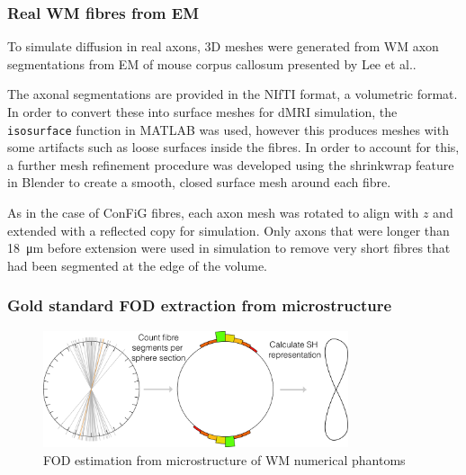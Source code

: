 \subsubsection{Real WM fibres from EM}
\label{sec:frf_real_axon_meshing}
To simulate diffusion in real axons, 3D meshes were generated from \ac{WM} axon segmentations from \acf{EM} of mouse corpus callosum presented by Lee et al.\cite{Lee2019b}.

The axonal segmentations are provided in the NIfTI format, a volumetric format. In order to convert these into surface meshes for \ac{dMRI} simulation, the \texttt{isosurface} function in MATLAB was used, however this produces meshes with some artifacts such as loose surfaces inside the fibres.
In order to account for this, a further mesh refinement procedure was developed using the shrinkwrap feature in Blender to create a smooth, closed surface mesh around each fibre.

As in the case of ConFiG fibres, each axon mesh was rotated to align with $z$ and extended with a reflected copy for simulation. Only axons that were longer than \SI{18}{\micro\metre} before extension were used in simulation to remove very short fibres that had been segmented at the edge of the volume. 

\subsubsection{Gold standard FOD extraction from microstructure}
\label{sec:frf_true_frf_extraction}
\begin{figure}
  \centering
  \includegraphics[width=0.8\textwidth]{figures/frf_experiment/od_estimation}
  \caption[\acs{FOD} estimation in \acs{WM} numerical phantoms]{\acs{FOD} estimation from microstructure of \ac{WM} numerical phantoms}
  \label{fig:frf_od_estimation}
\end{figure}

